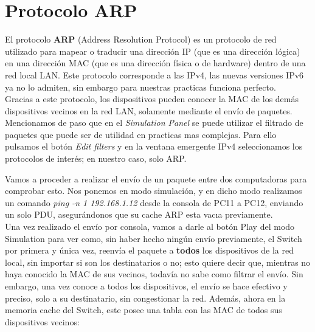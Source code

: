 \documentclass{article}
\begin{document}
\section{Protocolo ARP}

El protocolo \textbf{ARP} (Address Resolution Protocol) es un protocolo de red utilizado para mapear o traducir una dirección IP (que es una dirección lógica) en una dirección MAC (que es una dirección física o de hardware) dentro de una red local LAN. Este protocolo corresponde a las IPv4, las nuevas versiones IPv6 ya no lo admiten, sin embargo para nuestras practicas funciona perfecto.  \\

{\setlength{\parindent}{1pt} Gracias a este protocolo, los dispositivos pueden conocer la MAC de los demás dispositivos vecinos en la red LAN, solamente mediante el envío de paquetes. Mencionamos de paso que en el \textit{Simulation Panel} se puede utilizar el filtrado de paquetes que puede ser de utilidad en practicas mas complejas. Para ello pulsamos el botón \textit{Edit filters} y en la ventana emergente IPv4 seleccionamos los protocolos de interés; en nuestro caso, solo ARP.\\}

{\setlength{\parindent}{1pt} Vamos a proceder a realizar el envío de un paquete entre dos computadoras para comprobar esto. Nos ponemos en modo simulación, y en dicho modo realizamos un comando \textit{ping -n 1 192.168.1.12} desde la consola de PC11 a PC12, enviando un solo PDU, asegurándonos que su cache ARP esta vacıa previamente. \\

Una vez realizado el envío por consola, vamos a darle al botón Play del modo Simulation para ver como, sin haber hecho ningún envío previamente, el Switch por primera y única vez, reenvía el paquete a \textbf{todos} los dispositivos de la red local, sin importar si son los destinatarios o no; esto quiere decir que, mientras no haya conocido la MAC de sus vecinos, todavía no sabe como filtrar el envío. Sin embargo, una vez conoce a todos los dispositivos, el envío se hace efectivo y preciso, solo a su destinatario, sin congestionar la red. Además, ahora en la memoria cache del Switch, este posee una tabla con las MAC de todos sus dispositivos vecinos: \\}
\end{document}
